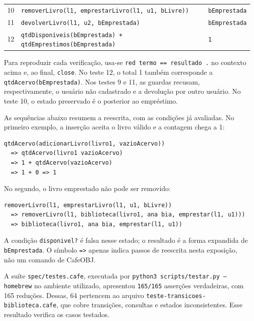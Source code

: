 \documentclass[a4paper,12pt]{article}
\begin{document}
\begin{table}[htbp]
\begin{tabularx}{\linewidth}{@{} c Y l @{}}
        10 & \texttt{removerLivro(\allowbreak{}l1,\allowbreak{} emprestarLivro(\allowbreak{}l1,\allowbreak{} u1,\allowbreak{} bLivre))}                                 & \texttt{bEmprestada}                         \\
        11 & \texttt{devolverLivro(\allowbreak{}l1,\allowbreak{} u2,\allowbreak{} bEmprestada)}                                               & \texttt{bEmprestada}                         \\
        12 & \texttt{qtdDisponiveis(\allowbreak{}bEmprestada) + qtdEmprestimos(\allowbreak{}bEmprestada)}                         & \texttt{1}                                   \\
        \bottomrule
    \end{tabularx}
\end{table}

Para reproduzir cada verificação, usa-se \texttt{red termo == resultado .}
no contexto acima e, ao final, \texttt{close}. No teste 12, o total 1 também
corresponde a \texttt{qtdAcervo(\allowbreak{}bEmprestada)}. Nos testes 9 e 11, as guardas
recusam, respectivamente, o usuário não cadastrado e a devolução por outro
usuário. No teste 10, o estado preservado é o posterior ao empréstimo.

As sequências abaixo resumem a reescrita, com as condições já avaliadas.
No primeiro exemplo, a inserção aceita o livro válido e a contagem chega a 1:
\begin{lstlisting}
qtdAcervo(adicionarLivro(livro1, vazioAcervo))
  => qtdAcervo(livro1 vazioAcervo)
  => 1 + qtdAcervo(vazioAcervo)
  => 1 + 0 => 1
\end{lstlisting}
No segundo, o livro emprestado não pode ser removido:
\begin{lstlisting}
removerLivro(l1, emprestarLivro(l1, u1, bLivre))
  => removerLivro(l1, biblioteca(livro1, ana bia, emprestar(l1, u1)))
  => biblioteca(livro1, ana bia, emprestar(l1, u1))
\end{lstlisting}
A condição \texttt{disponivel?} é falsa nesse estado; o resultado é a forma
expandida de \texttt{bEmprestada}. O símbolo \texttt{=>} apenas indica passos
de reescrita nesta exposição, não um comando de CafeOBJ.

A suíte \texttt{spec/\allowbreak{}testes.cafe}, executada por
\texttt{python3 scripts/\allowbreak{}testar.py --homebrew} no ambiente utilizado, apresentou
\texttt{165/\allowbreak{}165} asserções verdadeiras, com 165 reduções. Dessas, 64 pertencem
ao arquivo \texttt{teste-\allowbreak{}transicoes-\allowbreak{}biblioteca.cafe}, que cobre transições,
consultas e estados inconsistentes. Esse resultado verifica os casos testados.
\end{document}

